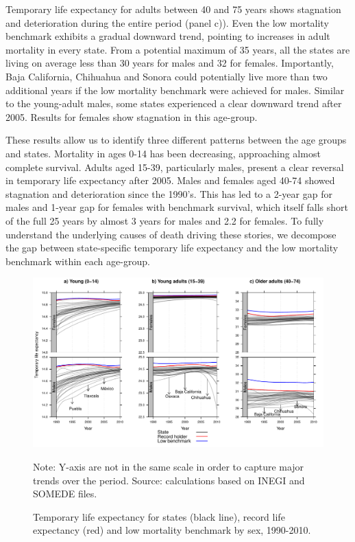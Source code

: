 \documentclass[11.5pt]{article}
\begin{document}
\begin{spacing}{1.5}
Temporary life expectancy for adults between 40 and 75 years shows stagnation and deterioration during the entire period (panel c)). Even the low mortality benchmark exhibits a gradual downward trend, pointing to increases in adult mortality in every state. From a potential maximum of 35 years, 
all the states are living on average less than 30 years for males and 32 for females. Importantly,  Baja California, Chihuahua and Sonora could potentially live more than two additional years if the low mortality benchmark were achieved for males. Similar to the young-adult males, some states experienced a  clear downward trend after 2005. Results for females show stagnation in this age-group. 

These results allow us to identify three different patterns between the age groups and states. Mortality in ages 0-14 has been decreasing, approaching almost complete survival. Adults aged 15-39, particularly males, present a clear reversal in temporary life expectancy after 2005. Males and females aged 40-74 showed stagnation and deterioration since the 1990's. This has led to a 2-year gap for males and 1-year gap for females with benchmark survival, which itself falls short of the full 25 years by almost 3 years for males and 2.2 for females. To fully understand the underlying causes of death driving these stories, we decompose the gap between state-specific temporary life expectancy and the low mortality benchmark within each age-group.


\begin{figure}
\label{Fig_temporary_le}
\centering
\caption{Temporary life expectancy for states (black line), record life
expectancy (red) and low mortality benchmark by sex, 1990-2010.}
\includegraphics[scale=.5]{Figures/Temp_fig.pdf}

Note: Y-axis are not in the same scale in order to capture major trends over the period. Source: calculations based on INEGI and SOMEDE files. 
\end{figure}


\end{spacing}
\end{document}
